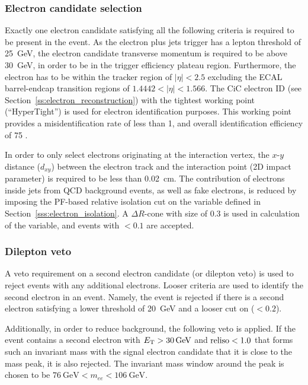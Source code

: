 \subsubsection*{Electron candidate selection}
Exactly one electron candidate satisfying all the following criteria is required to be present in the event. As the
electron plus jets trigger has a lepton \pt threshold of \SI{25}{\GeV}, the electron candidate transverse momentum is
required to be above \SI{30}{\GeV}, in order to be in the trigger efficiency plateau region. Furthermore, the electron
has to be within the tracker region of $|\eta| < 2.5$ excluding the ECAL barrel-endcap transition regions of $1.4442 <
|\eta| < 1.566$. The CiC electron ID (see Section~\ref{ss:electron_reconstruction}) with the tightest working point
(``HyperTight'') is used for electron identification purposes. This working point provides a misidentification rate of
less than \SI{1}{\pc}, and overall identification efficiency of \SI{75}{\pc} \autocite{CiC_ID}.

In order to only select electrons originating at the interaction vertex, the $x$-$y$ distance ($d_{xy}$) between the
electron track and the interaction point (2D impact parameter) is required to be less than \SI{0.02}{\cm}. The
contribution of electrons inside jets from QCD background events, as well as fake electrons, is reduced by imposing the
PF-based relative isolation cut on the variable \reliso defined in Section~\ref{sss:electron_isolation}. A $\Delta
R$-cone with size of \num{0.3} is used in calculation of the \reliso variable, and events with \reliso $< 0.1$ are
accepted.

\subsubsection*{Dilepton veto}
A veto requirement on a second electron candidate (or dilepton veto) is used to reject events with any additional
electrons. Looser criteria are used to identify the second electron in an event. Namely, the event is rejected if there
is a second electron satisfying a lower \ET threshold of \SI{20}{\GeV} and a looser cut on \reliso ($<0.2$).

Additionally, in order to reduce \ZpJets background, the following veto is applied. If the event contains a second
electron with $\ET > \SI{30}{\GeV}$ and $\textrm{reliso} < 1.0$ that forms such an invariant mass with the signal electron
candidate that it is close to the \Z mass peak, it is also rejected. The invariant mass window around the \Z peak is
chosen to be $\SI{76}{\GeV} < m_{ee} < \SI{106}{\GeV}$.

